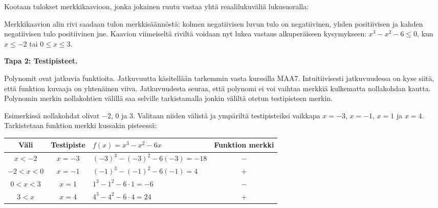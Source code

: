 Kootaan tulokset merkkikaavioon, jonka jokainen ruutu vastaa yhtä reaalilukuväliä lukusuoralla:
\begin{center}
    \begin{merkkikaavio}{3}

        \merkkikaavioMerkki{$-$}
        \merkkikaavioMerkki{$+$}
        \merkkikaavioMerkki{$+$}
        \merkkikaavioMerkki{$+$}

        \merkkikaavioUusirivi
        \merkkikaavioMerkki{$-$}
        \merkkikaavioMerkki{$-$}
        \merkkikaavioMerkki{$-$}
        \merkkikaavioMerkki{$+$}

        \merkkikaavioUusirivi
        \merkkikaavioMerkki{$-$}
        \merkkikaavioMerkki{$-$}
        \merkkikaavioMerkki{$+$}
        \merkkikaavioMerkki{$+$}

        \merkkikaavioUusiriviKaksoisviiva
        \merkkikaavioMerkki{$-$}
        \merkkikaavioMerkki{$+$}
        \merkkikaavioMerkki{$-$}
        \merkkikaavioMerkki{$+$}
    \end{merkkikaavio}
\end{center}
Merkkikaavion alin rivi saadaan tulon merkkisäännöstä: kolmen negatiivisen luvun tulo on negatiivinen, yhden positiivisen ja kahden negatiivisen tulo positiivinen jne.
Kaavion viimeiseltä riviltä voidaan nyt lukea vastaus alkuperäiseen kysymykseen: $x^3-x^2-6 \leq 0$, kun $x\leq -2$ tai $0\leq x \leq 3$.

\textbf{Tapa 2: Testipisteet.}

Polynomit ovat jatkuvia funktioita. Jatkuvuutta käsitellään tarkemmin vasta kurssilla MAA7.
Intuitiivisesti jatkuvuudessa on kyse siitä, että funktion kuvaaja on yhtenäinen viiva.
Jatkuvuudesta seuraa, että polynomi ei voi vaihtaa merkkiä kulkematta nollakohdan kautta.
Polynomin merkin nollakohtien välillä saa selville tarkistamalla jonkin väliltä otetun testipisteen merkin.

Esimerkissä nollakohdat olivat $-2$, $0$ ja $3$. Valitaan niiden välistä ja
ympäriltä testipisteiksi vaikkapa $x=-3$, $x=-1$, $x=1$ ja $x=4$. Tarkistetaan funktion merkki kussakin pisteessä:

\begin{tabular}{c|c|l|c}
Väli & Testipiste & $f(x)=x^3-x^2-6x$ & Funktion merkki \\
\hline
$x < -2$ & $x = -3$ & $(-3)^3 -(-3)^2 - 6(-3) = -18$ & $-$ \\
$-2 <x < 0$ & $x = -1$ & $(-1)^3 -(-1)^2 - 6(-1) =4$ & $+$ \\
$0 <x < 3$ & $x = 1$ & $1^3 -1^2 - 6\cdot 1 =  -6$ & $-$ \\
$3 <x $ & $x = 4$ & $4^3 -4^2 - 6\cdot 4 = 24$ & $+$
\end{tabular}

